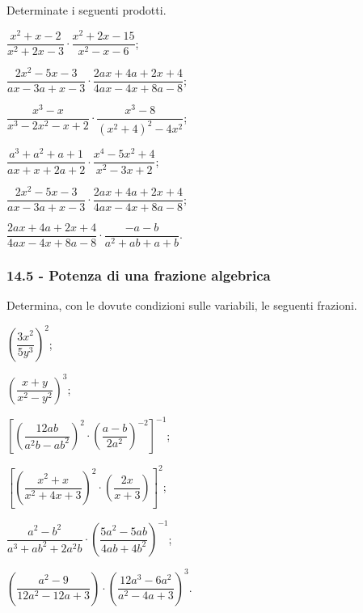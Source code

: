 \begin{esercizio}
\label{ese:14.17}
Determinate i seguenti prodotti.
\begin{multicols}{2}
\begin{enumeratea}
 \item $\dfrac{x^{2}+x-2}{x^{2}+2x-3}\cdot {\dfrac{x^{2}+2x-15}{x^{2}-x-6}}$;
 \item $\dfrac{2x^{2}-5x-3}{ax-3a+x-3}\cdot {\dfrac{2ax+4a+2x+4}{4ax-4x+8a-8}}$;
 \item $\dfrac{x^{3}-x}{x^{3}-2x^{2}-x+2}\cdot {\dfrac{x^{3}-8}{\left(x^{2}+4\right)^{2}-4x^{2}}}$;
 \item $\dfrac{a^{3}+a^{2}+a+1}{ax+x+2a+2}\cdot {\dfrac{x^{4}-5x^{2}+4}{x^{2}-3x+2}}$;
 \item $\dfrac{2x^{2}-5x-3}{ax-3a+x-3}\cdot {\dfrac{2ax+4a+2x+4}{4ax-4x+8a-8}}$;
 \item $\dfrac{2ax+4a+2x+4}{4ax-4x+8a-8}\cdot {\dfrac{-a-b}{a^{2}+ab+a+b}}$.
\end{enumeratea}
\end{multicols}
\end{esercizio}

\subsubsection*{14.5 - Potenza di una frazione algebrica}

\begin{esercizio}[\Ast]
\label{ese:14.18}
Determina, con le dovute condizioni sulle variabili, le seguenti frazioni.
\begin{multicols}{2}
\begin{enumeratea}
 \item $\left(\dfrac{3x^{2}}{5y^{3}}\right)^{2}$;
 \item $\left(\dfrac{x+y}{x^{2}-y^{2}}\right)^{3}$;
 \item $\left[\left(\dfrac{12ab}{a^{2}b-ab^{2}}\right)^{2}\cdot \left(\dfrac{a-b}{2a^{2}}\right)^{-2}\right]^{-1}$;
 \item $\left[\left(\dfrac{x^{2}+x}{x^{2}+4x+3}\right)^{2}\cdot \left(\dfrac{2x}{x+3}\right)\right]^{2}$;
 \item $\dfrac{a^{2}-b^{2}}{a^{3}+ab^{2}+2a^{2}b}\cdot\left(\dfrac{5a^{2}-5ab}{4ab+4b^{2}}\right)^{-1}$;
 \item $\left(\dfrac{a^{2}-9}{12a^{2}-12a+3}\right)\cdot \left(\dfrac{12a^{3}-6a^{2}}{a^{2}-4a+3}\right)^{3}$.
\end{enumeratea}
\end{multicols}
\end{esercizio}

